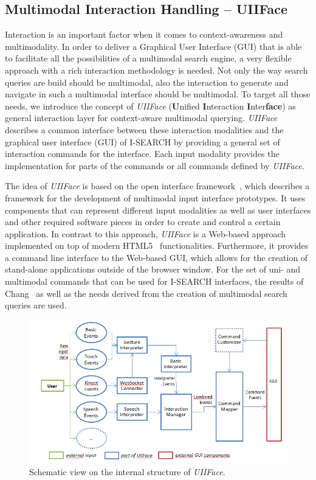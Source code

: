 \documentclass[runningheads,a4paper]{llncs} \usepackage[utf8]{inputenc}
\begin{document}
\subsection{Multimodal Interaction Handling -- UIIFace}
Interaction is an important factor when it comes to context-awareness and multimodality. In order to deliver a Graphical User Interface (GUI) that is able to facilitate all the possibilities of a multimodal search engine, a very flexible approach with a rich interaction methodology is needed. Not only the way search queries are build should be multimodal, also the interaction to generate and navigate in such a multimodal interface should be multimodal. To target all those needs, we introduce the concept of \emph{UIIFace} (\textbf{U}nified \textbf{I}nteraction \textbf{I}nter\textbf{face}) as general interaction layer for context-aware multimodal querying. \emph{UIIFace} describes a common interface between these interaction modalities and the graphical user interface (GUI) of \mbox{I-SEARCH} by providing a general set of interaction commands for the interface. Each input modality provides the implementation for parts of the commands or all commands defined by \emph{UIIFace}. 

The idea of \emph{UIIFace} is based on the open interface framework~\cite{openinterface}, which describes a framework for the development of multimodal input interface prototypes. It uses components that can represent different input modalities as well as user interfaces and other required software pieces in order to create and control a certain application. In contrast to this approach, \emph{UIIFace} is a Web-based approach implemented on top of modern HTML5~\cite{html5} functionalities. Furthermore, it provides a command line interface to the Web-based GUI, which allows for the creation of stand-alone applications outside of the browser window. For the set of uni- and multimodal commands that can be used for \mbox{I-SEARCH} interfaces, the results of Chang~\cite{chang} as well as the needs derived from the creation of multimodal search queries are used.

\begin{figure}[h!]
  \centering
    \includegraphics[width=0.8\linewidth]{resources/uiiface-structure.png}
  \caption{Schematic view on the internal structure of \emph{UIIFace}.}
  \label{fig:uiiface}
\end{figure}
\end{document}
